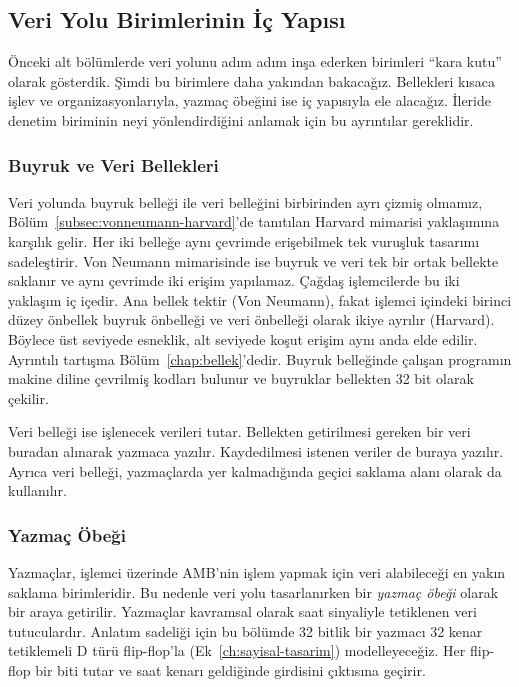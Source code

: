 \subsection{Veri Yolu Birimlerinin İç Yapısı}
\label{subsec:vy-ic-yapi}

Önceki alt bölümlerde veri yolunu adım adım inşa ederken birimleri ``kara kutu'' olarak gösterdik. Şimdi bu birimlere daha yakından bakacağız. Bellekleri kısaca işlev ve organizasyonlarıyla, yazmaç öbeğini ise iç yapısıyla ele alacağız. İleride denetim biriminin neyi yönlendirdiğini anlamak için bu ayrıntılar gereklidir.

\subsubsection{Buyruk ve Veri Bellekleri}

Veri yolunda buyruk belleği ile veri belleğini birbirinden ayrı çizmiş olmamız, Bölüm~\ref{subsec:vonneumann-harvard}'de tanıtılan Harvard mimarisi yaklaşımına karşılık gelir. Her iki belleğe aynı çevrimde erişebilmek tek vuruşluk tasarımı sadeleştirir. Von Neumann mimarisinde ise buyruk ve veri tek bir ortak bellekte saklanır ve aynı çevrimde iki erişim yapılamaz. Çağdaş işlemcilerde bu iki yaklaşım iç içedir. Ana bellek tektir (Von Neumann), fakat işlemci içindeki birinci düzey önbellek buyruk önbelleği ve veri önbelleği olarak ikiye ayrılır (Harvard). Böylece üst seviyede esneklik, alt seviyede koşut erişim aynı anda elde edilir. Ayrıntılı tartışma Bölüm~\ref{chap:bellek}'dedir. Buyruk belleğinde çalışan programın makine diline çevrilmiş kodları bulunur ve buyruklar bellekten 32 bit olarak çekilir.

Veri belleği ise işlenecek verileri tutar. Bellekten getirilmesi gereken bir veri buradan alınarak yazmaca yazılır. Kaydedilmesi istenen veriler de buraya yazılır. Ayrıca veri belleği, yazmaçlarda yer kalmadığında geçici saklama alanı olarak da kullanılır.

\subsubsection{Yazmaç Öbeği}

Yazmaçlar, işlemci üzerinde AMB'nin işlem yapmak için veri alabileceği en yakın saklama birimleridir. Bu nedenle veri yolu tasarlanırken bir \emph{yazmaç öbeği} olarak bir araya getirilir. Yazmaçlar kavramsal olarak saat sinyaliyle tetiklenen veri tutuculardır. Anlatım sadeliği için bu bölümde 32 bitlik bir yazmacı 32 kenar tetiklemeli D türü flip-flop'la (Ek~\ref{ch:sayisal-tasarim}) modelleyeceğiz. Her flip-flop bir biti tutar ve saat kenarı geldiğinde girdisini çıktısına geçirir.

